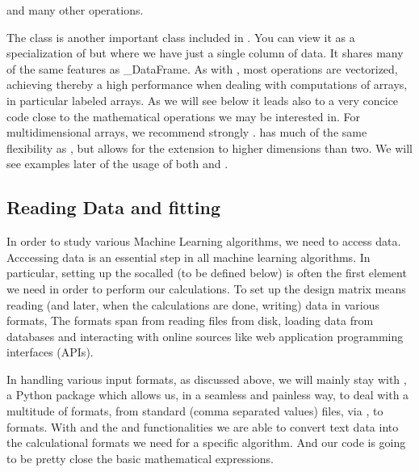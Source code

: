 \documentclass[letterpaper,10pt,english]{sphinxmanual}
\begin{document}
and many other operations.

The  class is another important class included in
. You can view it as a specialization of  but where
we have just a single column of data. It shares many of the same features as \_DataFrame. As with ,
most operations are vectorized, achieving thereby a high performance when dealing with computations of arrays, in particular labeled arrays.
As we will see below it leads also to a very concice code close to the mathematical operations we may be interested in.
For multidimensional arrays, we recommend strongly .  has much of the same flexibility as , but allows for the extension to higher dimensions than two. We will see examples later of the usage of both  and .


\subsection{Reading Data and fitting}
\label{\detokenize{chapter2:reading-data-and-fitting}}
In order to study various Machine Learning algorithms, we need to
access data. Acccessing data is an essential step in all machine
learning algorithms. In particular, setting up the so\sphinxhyphen{}called  (to be defined below) is often the first element we need in
order to perform our calculations. To set up the design matrix means
reading (and later, when the calculations are done, writing) data
in various formats, The formats span from reading files from disk,
loading data from databases and interacting with online sources
like web application programming interfaces (APIs).

In handling various input formats, as discussed above, we will mainly stay with ,
a Python package which allows us, in a seamless and painless way, to
deal with a multitude of formats, from standard  (comma separated
values) files, via ,  to  formats.  With 
and the   and  functionalities we are able to convert text data
into the calculational formats we need for a specific algorithm. And our code is going to be
pretty close the basic mathematical expressions.
\end{document}

